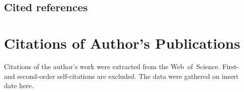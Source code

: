 \section{Cited references}

\printbibliography[notkeyword=mine,heading=none,title={}]


\renewcommand{\thechapter}{B}
\renewcommand\chaptername{Citation of author's work}

\chapter{Citations of Author's Publications}

Citations of the author's work were extracted from the Web~of~Science.
First- and second-order self-citations are excluded.
The data were gathered on {\color{red} insert date here}.

\DeclareCiteCommand{\fullcite}
{}
{%
  \usedriver
  {%
  }
{}}
{\multicitedelim}
{}

\begin{refsection}
  \nocite{*}
  \printbibliography[heading=none,title={},env=mycitations]
\end{refsection}


